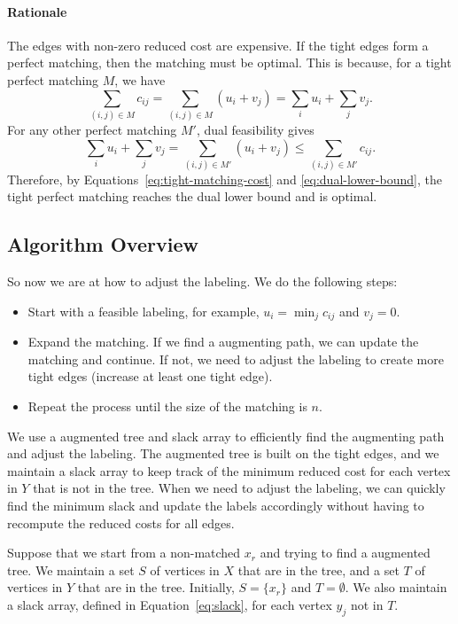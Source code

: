 \documentclass[acmsmall,nonacm]{acmart}
\theoremstyle{plain}
\theoremstyle{remark}
\begin{document}
\paragraph{Rationale} The edges with non-zero reduced cost are expensive. If the tight edges form a perfect matching, then the matching must be optimal. This is because, for a tight perfect matching $M$, we have
\begin{equation}
    \label{eq:tight-matching-cost}
    \sum_{(i,j) \in M} c_{ij}
    =
    \sum_{(i,j) \in M} (u_i + v_j)
    =
    \sum_i u_i + \sum_j v_j .
\end{equation}
For any other perfect matching $M'$, dual feasibility gives
\begin{equation}
    \label{eq:dual-lower-bound}
    \sum_i u_i + \sum_j v_j
    =
    \sum_{(i,j) \in M'}(u_i+v_j)
    \leq
    \sum_{(i,j) \in M'} c_{ij}.
\end{equation}
Therefore, by Equations~\ref{eq:tight-matching-cost} and
\ref{eq:dual-lower-bound}, the tight perfect matching reaches the dual lower
bound and is optimal.

\subsection{Algorithm Overview} 
\label{subsec:overview}

So now we are at how to adjust the labeling. We do the following steps:
\begin{itemize}
    \item Start with a feasible labeling, for example, $u_i = \min_j c_{ij}$ and $v_j = 0$. 
    \item Expand the matching. If we find a augmenting path, we can update the matching and continue. If not, we need to adjust the labeling to create more tight edges (increase at least one tight edge). 
    \item Repeat the process until the size of the matching is $n$.
\end{itemize}

We use a augmented tree and slack array to efficiently find the augmenting path and adjust the labeling. The augmented tree is built on the tight edges, and we maintain a slack array to keep track of the minimum reduced cost for each vertex in $Y$ that is not in the tree. When we need to adjust the labeling, we can quickly find the minimum slack and update the labels accordingly without having to recompute the reduced costs for all edges.

Suppose that we start from a non-matched $x_r$ and trying to find a augmented tree. We maintain a set $S$ of vertices in $X$ that are in the tree, and a set $T$ of vertices in $Y$ that are in the tree. Initially, $S = \{x_r\}$ and $T = \emptyset$. We also maintain a slack array, defined in Equation~\ref{eq:slack}, for each vertex $y_j$ not in $T$.
\end{document}

